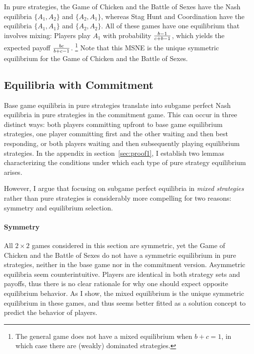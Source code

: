 \documentclass[main.tex]{subfiles}
\begin{document}
In pure strategies, the Game of Chicken and the Battle of Sexes have the Nash equilibria $\{A_1,A_2\}$ and $\{A_2,A_1\}$, whereas Stag Hunt and Coordination have the equilibria $\{A_1,A_1\}$ and $\{A_2,A_2\}$. All of these games have one equilibrium that involves mixing: Players play $A_1$ with probability $\frac{b-1}{c+b-1}$, which yields the expected payoff $\frac{bc}{b+c-1}$. \footnote{The general game does not have a mixed equilibrium when $b+c=1$, in which case there are (weakly) dominated strategies.} Note that this MSNE is the unique symmetric equilibrium for the Game of Chicken and the Battle of Sexes.

\subsection*{\centering  Equilibria with Commitment}
Base game equilibria in pure strategies translate into subgame perfect Nash equilibria in pure strategies in the commitment game. This can occur in three distinct ways: both players committing upfront to base game equilibrium strategies, one player committing first and the other waiting and then best responding, or both players waiting and then subsequently playing equilibrium strategies. In the appendix in section~\ref{sec:proof1}, I establish two lemmas characterizing the conditions under which each type of pure strategy equilibrium arises. 
 
However, I argue that focusing on subgame perfect equilibria in \textit{mixed strategies} rather than pure strategies is considerably more compelling for two reasons: symmetry and equilibrium selection.
\paragraph{Symmetry} All $2\times2$ games considered in this section are symmetric, yet the Game of Chicken and the Battle of Sexes do not have a symmetric equilibrium in pure strategies, neither in the base game nor in the commitment version. Asymmetric equilibria seem counterintuitive. Players are identical in both strategy sets and payoffs, thus there is no clear rationale for why one should expect opposite equilibrium behavior. As I show, the mixed equilibrium is the unique symmetric equilibrium in these games, and thus seems better fitted as a solution concept to predict the behavior of players.
 
\end{document}
